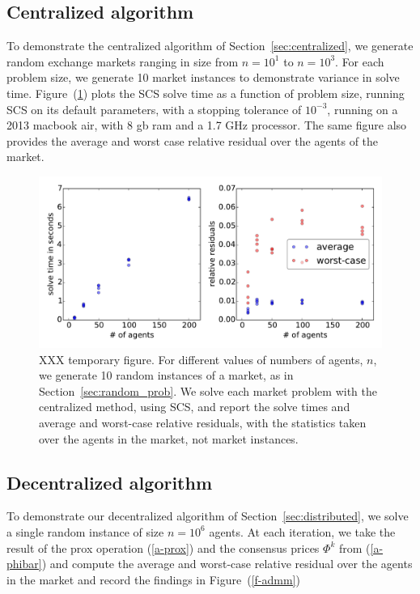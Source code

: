 \documentclass[12pt]{article}
\begin{document}
\subsection{Centralized algorithm}
To demonstrate the centralized algorithm of Section~\ref{sec:centralized},
we generate random exchange markets ranging in size
from $n=10^1$ to $n=10^3$.
For each problem size, we generate 10 market instances to demonstrate
variance in solve time.
Figure~(\ref{f-cvxpy}) %
plots the SCS solve time as a function of problem size, running
SCS on its default parameters, with a stopping tolerance of $10^{-3}$,
running on a 2013 macbook air, with 8 gb ram and a 1.7 GHz processor.
The same figure also provides the average and worst case relative residual over the agents of the market.


\begin{figure}
\begin{center}
\includegraphics[width=1.0\textwidth]{figures/cvxpy}
\caption{XXX temporary figure. For different values of numbers of agents, $n$,
we generate 10 random instances of a market, as in Section~\ref{sec:random_prob}. We solve each market problem with the centralized method, using SCS, and report the solve times and average and worst-case relative residuals, with the statistics taken over the agents in the market, not market instances.}
\end{center}
\label{f-cvxpy}
\end{figure}


\subsection{Decentralized algorithm}
To demonstrate our decentralized algorithm of Section~\ref{sec:distributed},
we solve a single random instance of size $n=10^6$ agents.
At each iteration, we take the result of the prox operation (\ref{a-prox}) and the consensus prices $\Phi^k$ from (\ref{a-phibar}) and compute
the average and worst-case relative residual over the agents in the market
and record the findings
in Figure~(\ref{f-admm}) %
\end{document}
